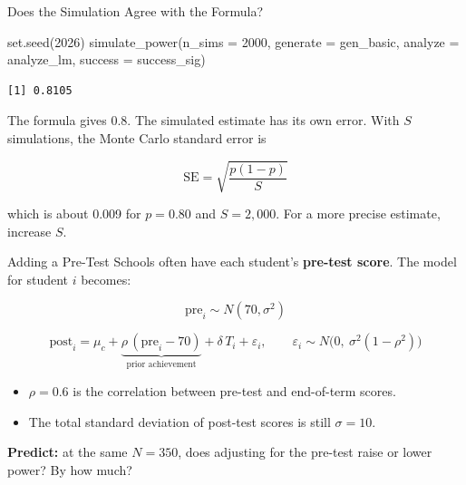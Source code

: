 \documentclass[
  ignorenonframetext,
  aspectratio=169,
]{beamer}
\newenvironment{Shaded}{\begin{snugshade}}{\end{snugshade}}
\newcommand{\AttributeTok}[1]{\textcolor[rgb]{0.40,0.45,0.13}{#1}}
\newcommand{\DecValTok}[1]{\textcolor[rgb]{0.68,0.00,0.00}{#1}}
\newcommand{\FunctionTok}[1]{\textcolor[rgb]{0.28,0.35,0.67}{#1}}
\newcommand{\NormalTok}[1]{\textcolor[rgb]{0.00,0.23,0.31}{#1}}
\providecommand{\tightlist}{%
  \setlength{\itemsep}{0pt}\setlength{\parskip}{0pt}}
\begin{document}
\begin{frame}[fragile]{Does the Simulation Agree with the Formula?}
\label{does-the-simulation-agree-with-the-formula}
\begin{Shaded}
\begin{Highlighting}[]
\FunctionTok{set.seed}\NormalTok{(}\DecValTok{2026}\NormalTok{)}
\FunctionTok{simulate\_power}\NormalTok{(}\AttributeTok{n\_sims =} \DecValTok{2000}\NormalTok{, }\AttributeTok{generate =}\NormalTok{ gen\_basic,}
               \AttributeTok{analyze =}\NormalTok{ analyze\_lm, }\AttributeTok{success =}\NormalTok{ success\_sig)}
\end{Highlighting}
\end{Shaded}

\begin{verbatim}
[1] 0.8105
\end{verbatim}

\vspace{0.4em}

\small The formula gives 0.8. The simulated estimate has its own error.
With \(S\) simulations, the Monte Carlo standard error is

\[
\text{SE} = \sqrt{\frac{p(1-p)}{S}}
\]

which is about 0.009 for \(p = 0.80\) and \(S = 2{,}000\). For a more
precise estimate, increase \(S\).
\end{frame}

\begin{frame}{Adding a Pre-Test}
\label{adding-a-pre-test}
\small Schools often have each student's \textbf{pre-test score}. The
model for student \(i\) becomes:

\[
\text{pre}_i \sim N(70, \sigma^2)
\]

\[
\text{post}_i = \mu_c +
\underbrace{\rho\,(\text{pre}_i - 70)}_{\text{prior achievement}} +
\delta \, T_i +
\varepsilon_i,
\qquad \varepsilon_i \sim N\big(0,\ \sigma^2(1-\rho^2)\big)
\]

\begin{itemize}
\tightlist
\item
  \(\rho = 0.6\) is the correlation between pre-test and end-of-term
  scores.
\item
  The total standard deviation of post-test scores is still
  \(\sigma = 10\).
\end{itemize}

\vspace{0.4em}

\begin{center}
\textbf{Predict:} at the same $N = 350$, does adjusting for the pre-test raise or lower power? By how much?
\end{center}
\end{frame}
\end{document}
